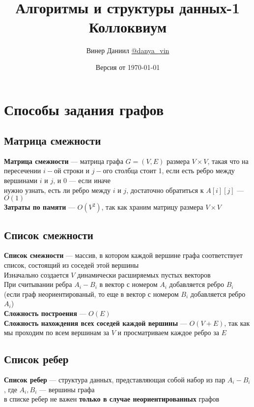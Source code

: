 \documentclass[a4paper]{article}
\begin{document}
\title{\LARGE{Алгоритмы и структуры данных-1}\\ Коллоквиум}
\author{Винер Даниил \href{https://t.me/danya_vin}{@danya\_vin}}
\date{Версия от \today}
\maketitle
\tableofcontents
\newpage
\section{Способы задания графов}
\subsection{Матрица смежности}
\textbf{Матрица смежности} — матрица графа $G=(V,E)$ размера $V\times V$, такая что на пересечении $i-$ой строки и $j-$ого столбца стоит 1, если есть ребро между вершинами $i$ и $j$, и 0 — если иначе\\[2mm]
 нужно узнать, есть ли ребро между \(i\) и \(j\), достаточно обратиться к \(A[i][j]\) — $O(1)$\\[2mm]
\indent\textbf{Затраты по памяти} — $O(V^2)$, так как храним матрицу размера $V\times V$

\subsection{Список смежности}
\textbf{Список смежности} — массив, в котором каждой вершине графа соответствует список, состоящий из соседей этой вершины\\[2mm]
\indent Изначально создается $V$ динамически расширяемых пустых векторов\\[2mm]
\indent При считывании ребра $A_i-B_i$ в вектор с номером $A_i$ добавляется ребро $B_i$ (если граф неориентированый, то еще в вектор с номером $B_i$ добавляется ребро $A_i$)\\[2mm]
\indent\textbf{Сложность построения} — $O(E)$\\[2mm]
\indent\textbf{Сложность нахождения всех соседей каждой вершины} — $O(V+E)$, так как мы проходим по всем вершинам за $V$ и просматриваем каждое ребро за $E$

\subsection{Список ребер}
\textbf{Список ребер} — структура данных, представляющая собой набор из пар $A_i-B_i$, где $A_i,B_i$ — вершины графа\\[2mm]
 в списке ребер не важен \textbf{только в случае неориентированных} графов
\end{document}
